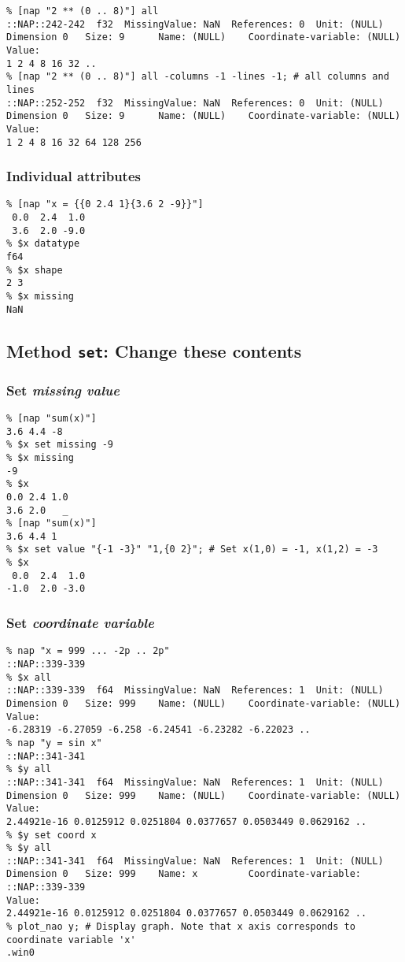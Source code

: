     \begin{verbatim}
% [nap "2 ** (0 .. 8)"] all
::NAP::242-242  f32  MissingValue: NaN  References: 0  Unit: (NULL)
Dimension 0   Size: 9      Name: (NULL)    Coordinate-variable: (NULL)
Value:
1 2 4 8 16 32 ..
% [nap "2 ** (0 .. 8)"] all -columns -1 -lines -1; # all columns and lines
::NAP::252-252  f32  MissingValue: NaN  References: 0  Unit: (NULL)
Dimension 0   Size: 9      Name: (NULL)    Coordinate-variable: (NULL)
Value:
1 2 4 8 16 32 64 128 256
\end{verbatim}

\subsubsection{Individual attributes}

    \begin{verbatim}
% [nap "x = {{0 2.4 1}{3.6 2 -9}}"]
 0.0  2.4  1.0
 3.6  2.0 -9.0
% $x datatype
f64
% $x shape
2 3
% $x missing
NaN
\end{verbatim}

\subsection{Method \texttt{set}: Change these contents}
      \label{demo-ooc-set}

\subsubsection{Set \emph{missing value}}

    \begin{verbatim}
% [nap "sum(x)"]
3.6 4.4 -8
% $x set missing -9
% $x missing
-9
% $x 
0.0 2.4 1.0
3.6 2.0   _
% [nap "sum(x)"]
3.6 4.4 1
% $x set value "{-1 -3}" "1,{0 2}"; # Set x(1,0) = -1, x(1,2) = -3
% $x
 0.0  2.4  1.0
-1.0  2.0 -3.0
\end{verbatim}

\subsubsection{Set \emph{coordinate variable}}

    \begin{verbatim}
% nap "x = 999 ... -2p .. 2p"
::NAP::339-339
% $x all
::NAP::339-339  f64  MissingValue: NaN  References: 1  Unit: (NULL)
Dimension 0   Size: 999    Name: (NULL)    Coordinate-variable: (NULL)
Value:
-6.28319 -6.27059 -6.258 -6.24541 -6.23282 -6.22023 ..
% nap "y = sin x"
::NAP::341-341
% $y all
::NAP::341-341  f64  MissingValue: NaN  References: 1  Unit: (NULL)
Dimension 0   Size: 999    Name: (NULL)    Coordinate-variable: (NULL)
Value:
2.44921e-16 0.0125912 0.0251804 0.0377657 0.0503449 0.0629162 ..
% $y set coord x
% $y all
::NAP::341-341  f64  MissingValue: NaN  References: 1  Unit: (NULL)
Dimension 0   Size: 999    Name: x         Coordinate-variable: ::NAP::339-339
Value:
2.44921e-16 0.0125912 0.0251804 0.0377657 0.0503449 0.0629162 ..
% plot_nao y; # Display graph. Note that x axis corresponds to coordinate variable 'x'
.win0
\end{verbatim}

